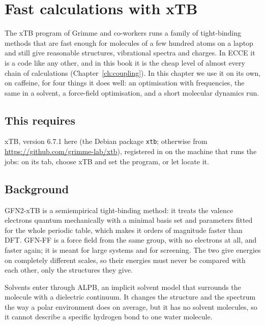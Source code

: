 \chapter{Fast calculations with xTB}
\label{ch:xtb}

The xTB program of Grimme and co-workers runs a family of tight-binding methods that are fast enough for molecules of a few hundred atoms on a laptop and still give reasonable structures, vibrational spectra and charges. In ECCE it is a code like any other, and in this book it is the cheap level of almost every chain of calculations (Chapter~\ref{ch:coupling}). In this chapter we use it on its own, on caffeine, for four things it does well: an optimisation with frequencies, the same in a solvent, a force-field optimisation, and a short molecular dynamics run.

\section*{This requires}
xTB, version 6.7.1 here (the Debian package \texttt{xtb}; otherwise from \url{https://github.com/grimme-lab/xtb}), registered in  on the machine that runs the jobs: on its  tab, choose xTB and set the program, or let  locate it.

\section{Background}
GFN2-xTB is a semiempirical tight-binding method: it treats the valence electrons quantum mechanically with a minimal basis set and parameters fitted for the whole periodic table, which makes it orders of magnitude faster than DFT. GFN-FF is a force field from the same group, with no electrons at all, and faster again; it is meant for large systems and for screening. The two give energies on completely different scales, so their energies must never be compared with each other, only the structures they give.

Solvents enter through ALPB, an implicit solvent model that surrounds the molecule with a dielectric continuum. It changes the structure and the spectrum the way a polar environment does on average, but it has no solvent molecules, so it cannot describe a specific hydrogen bond to one water molecule.

